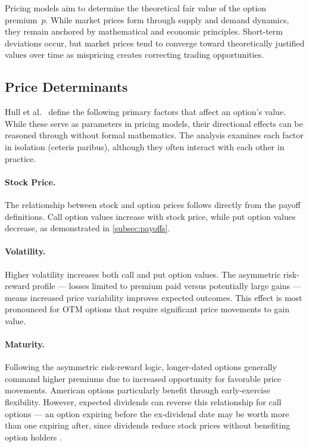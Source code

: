 \documentclass[english,12pt,a4paper,pdftex,sci,utf8]{aaltothesis}
\begin{document}
Pricing models aim to determine the theoretical fair value of the option \mbox{premium $p$.} While market prices form through supply and demand dynamics, they remain anchored by mathematical and economic principles. Short-term deviations occur, but market prices tend to converge toward theoretically justified values over time as mispricing creates correcting trading opportunities.

\clearpage

\subsection{Price Determinants}

Hull et al.\ \cite{hull2013fundamentals} define the following primary factors that affect an option's value. While these serve as parameters in pricing models, their directional effects can be reasoned through without formal mathematics. The analysis examines each factor in isolation (ceteris paribus), although they often interact with each other in practice.

\paragraph{Stock Price.} The relationship between stock and option prices follows directly from the payoff definitions. Call option values increase with stock price, while put option values decrease, as demonstrated in \cref{subsec:payoffs}.

\paragraph{Volatility.} Higher volatility increases both call and put option values. The asymmetric risk-reward profile --- losses limited to premium paid versus potentially large gains --- means increased price variability improves expected outcomes. This effect is most pronounced for OTM options that require significant price movements to gain value.

\paragraph{Maturity.} Following the asymmetric risk-reward logic, longer-dated options generally command higher premiums due to increased opportunity for favorable price movements. American options particularly benefit through early-exercise flexibility. However, expected dividends can reverse this relationship for call options --- an option expiring before the ex-dividend date may be worth more than one expiring after, since dividends reduce stock prices without benefiting option holders \cite{hull2013fundamentals}.
\end{document}
